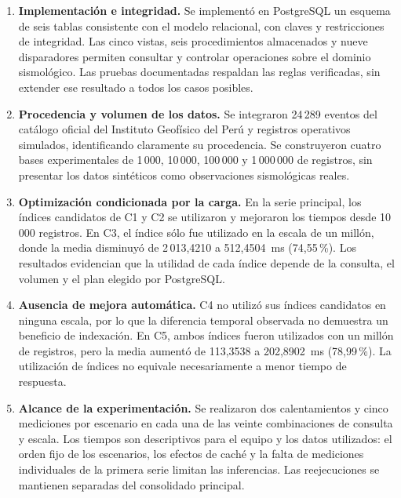\documentclass[12pt,a4paper]{article}
\begin{document}
\begin{enumerate}[leftmargin=*,label=\arabic*.,itemsep=0.65em,parsep=0pt]
    \item \textbf{Implementación e integridad.} Se implementó en PostgreSQL un esquema de seis tablas consistente con el modelo relacional, con claves y restricciones de integridad. Las cinco vistas, seis procedimientos almacenados y nueve disparadores permiten consultar y controlar operaciones sobre el dominio sismológico. Las pruebas documentadas respaldan las reglas verificadas, sin extender ese resultado a todos los casos posibles.

    \item \textbf{Procedencia y volumen de los datos.} Se integraron 24\,289 eventos del catálogo oficial del Instituto Geofísico del Perú y registros operativos simulados, identificando claramente su procedencia. Se construyeron cuatro bases experimentales de 1\,000, 10\,000, 100\,000 y 1\,000\,000 de registros, sin presentar los datos sintéticos como observaciones sismológicas reales.

    \item \textbf{Optimización condicionada por la carga.} En la serie principal, los índices candidatos de C1 y C2 se utilizaron y mejoraron los tiempos desde 10\,000 registros. En C3, el índice sólo fue utilizado en la escala de un millón, donde la media disminuyó de 2\,013,4210 a 512,4504~ms (74,55\,\%). Los resultados evidencian que la utilidad de cada índice depende de la consulta, el volumen y el plan elegido por PostgreSQL.

    \item \textbf{Ausencia de mejora automática.} C4 no utilizó sus índices candidatos en ninguna escala, por lo que la diferencia temporal observada no demuestra un beneficio de indexación. En C5, ambos índices fueron utilizados con un millón de registros, pero la media aumentó de 113,3538 a 202,8902~ms (78,99\,\%). La utilización de índices no equivale necesariamente a menor tiempo de respuesta.

    \item \textbf{Alcance de la experimentación.} Se realizaron dos calentamientos y cinco mediciones por escenario en cada una de las veinte combinaciones de consulta y escala. Los tiempos son descriptivos para el equipo y los datos utilizados: el orden fijo de los escenarios, los efectos de caché y la falta de mediciones individuales de la primera serie limitan las inferencias. Las reejecuciones se mantienen separadas del consolidado principal.


\end{enumerate}
\end{document}
